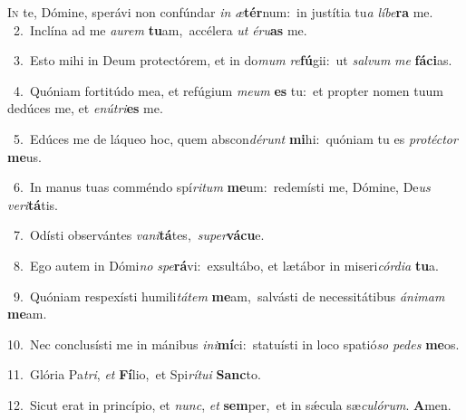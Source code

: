 \lettrine{\initial\textcolor{\initialcolor}{I}}{n} te, Dómine, sperávi non confúndar \textit{in} \textit{æ}\-\textbf{tér}num:~\star in justítia tu\textit{a} \textit{lí}\-\textit{be}\textbf{ra} me.\\
{\numbfont\textcolor{\numbcolor}{~2.}}~Inclína ad me \textit{au}\-\textit{rem} \textbf{tu}\-am,~\star accélera \textit{ut} \textit{é}\-\textit{ru}\textbf{as} me.\par
{\numbfont\textcolor{\numbcolor}{~3.}}~Esto mihi in Deum protectórem, et in do\textit{mum} \textit{re}\-\textbf{fú}gii:~\star ut \textit{sal}\-\textit{vum} \textit{me} \textbf{fá}\-\textbf{ci}as.\par
{\numbfont\textcolor{\numbcolor}{~4.}}~Quóniam fortitúdo mea, et refúgium \textit{me}\-\textit{um} \textbf{es} tu:~\star et propter nomen tuum dedúces me, et \textit{e}\-\textit{nú}\textit{tri}\textbf{es} me.\par
{\numbfont\textcolor{\numbcolor}{~5.}}~Edúces me de láqueo hoc, quem abscon\-\textit{dé}\-\textit{runt} \textbf{mi}\-hi:~\star quóniam tu es \textit{pro}\-\textit{téc}\textit{tor} \textbf{me}\-us.\par
{\numbfont\textcolor{\numbcolor}{~6.}}~In manus tuas comméndo spí\-\textit{ri}\-\textit{tum} \textbf{me}\-um:~\star redemísti me, Dómine, De\textit{us} \textit{ve}\-\textit{ri}\textbf{tá}tis.\par
{\numbfont\textcolor{\numbcolor}{~7.}}~Odísti observántes \textit{va}\-\textit{ni}\textbf{tá}tes,~\star \textit{su}\-\textit{per}\textbf{vá}\textbf{cu}e.\par
{\numbfont\textcolor{\numbcolor}{~8.}}~Ego autem in Dómi\textit{no} \textit{spe}\-\textbf{rá}vi:~\star exsultábo, et lætábor in miseri\-\textit{cór}\-\textit{di}\textit{a} \textbf{tu}\-a.\par
{\numbfont\textcolor{\numbcolor}{~9.}}~Quóniam respexísti humili\-\textit{tá}\-\textit{tem} \textbf{me}\-am,~\star salvásti de necessitátibus \textit{á}\-\textit{ni}\textit{mam} \textbf{me}\-am.\par
{\numbfont\textcolor{\numbcolor}{10.}}~Nec conclusísti me in mánibus \textit{in}\-\textit{i}\textbf{mí}ci:~\star statuísti in loco spatió\textit{so} \textit{pe}\-\textit{des} \textbf{me}\-os.\par
{\numbfont\textcolor{\numbcolor}{11.}}~Glória Pa\-\textit{tri}\-, \textit{et} \textbf{Fí}\-lio,~\star et Spi\-\textit{rí}\-\textit{tu}\textit{i} \textbf{Sanc}\-to.\par
{\numbfont\textcolor{\numbcolor}{12.}}~Sicut erat in princípio, et \textit{nunc}\-, \textit{et} \textbf{sem}\-per,~\star et in sǽcula sæ\-\textit{cu}\-\textit{ló}\textit{rum}. \textbf{A}\-men.\par

